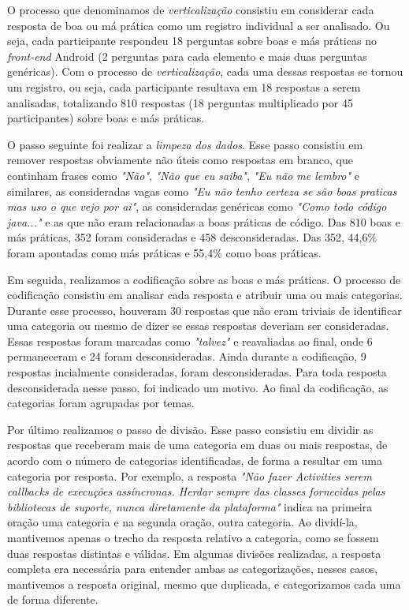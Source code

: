 O processo que denominamos de \textit{verticalização} consistiu em considerar cada resposta de boa ou má prática como um registro individual a ser analisado. Ou seja, cada participante respondeu 18 perguntas sobre boas e más práticas no \textit{front-end} Android (2 perguntas para cada elemento e mais duas perguntas genéricas). Com o processo de \textit{verticalização}, cada uma dessas respostas se tornou um registro, ou seja, cada participante resultava em 18 respostas a serem analisadas, totalizando 810 respostas (18 perguntas multiplicado por 45 participantes) sobre boas e más práticas.

O passo seguinte foi realizar a \textit{limpeza dos dados}. Esse passo consistiu em remover respostas obviamente não úteis como respostas em branco, que continham frases como \textit{"Não"}, \textit{"Não que eu saiba"}, \textit{"Eu não me lembro"} e similares, as consideradas vagas como \textit{"Eu não tenho certeza se são boas praticas mas uso o que vejo por ai"}, as consideradas genéricas como \textit{"Como todo código java..."} e as que não eram relacionadas a boas práticas de código. Das 810 boas e más práticas, 352 foram consideradas e 458 desconsideradas. Das 352, 44,6\% foram apontadas como más práticas e 55,4\% como boas práticas. 

Em seguida, realizamos a codificação sobre as boas e más práticas. O processo de codificação consistiu em analisar cada resposta e atribuir uma ou mais categorias. Durante esse processo, houveram 30 respostas que não eram triviais de identificar uma categoria ou mesmo de dizer se essas respostas deveriam ser consideradas. Essas respostas foram marcadas como \textit{"talvez"} e reavaliadas ao final, onde 6 permaneceram e 24 foram desconsideradas. Ainda durante a codificação, 9 respostas incialmente consideradas, foram desconsideradas. Para toda resposta desconsiderada nesse passo, foi indicado um motivo. Ao final da codificação, as categorias foram agrupadas por temas.

Por último realizamos o passo de divisão. Esse passo consistiu em dividir as respostas que receberam mais de uma categoria em duas ou mais respostas, de acordo com o número de categorias identificadas, de forma a resultar em uma categoria por resposta. Por exemplo, a resposta \textit{"Não fazer Activities serem callbacks de execuções assíncronas. Herdar sempre das classes fornecidas pelas bibliotecas de suporte, nunca diretamente da plataforma"} indica na primeira oração uma categoria e na segunda oração, outra categoria. Ao dividí-la, mantivemos apenas o trecho da resposta relativo a categoria, como se fossem duas respostas distintas e válidas. Em algumas divisões realizadas, a resposta completa era necessária para entender ambas as categorizações, nesses casos, mantivemos a resposta original, mesmo que duplicada, e categorizamos cada uma de forma diferente. 

